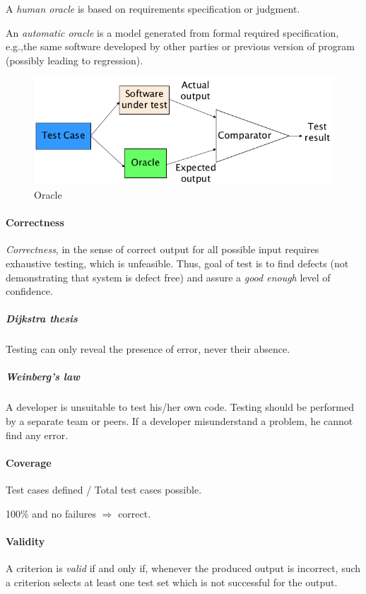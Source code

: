 A \emph{human oracle} is based on requirements specification or judgment.

An \emph{automatic oracle} is a model generated from formal required specification, e.g.,\@ the same software developed by other parties or previous version of program (possibly leading to regression).

\begin{figure}[hbtp]
\centering
\includegraphics[scale=0.35]{images/oracle.png}
\caption{Oracle}
\end{figure}

\paragraph{Correctness}
\emph{Correctness}, in the sense of correct output for all possible input requires exhaustive testing, which is unfeasible. Thus, goal of test is to find defects (not demonstrating that system is defect free) and assure a \emph{good enough} level of confidence.

\subparagraph{Dijkstra thesis} Testing can only reveal the presence of error, never their absence.

\subparagraph{Weinberg's law} A developer is unsuitable to test his/her own code. Testing should be performed by a separate team or peers. If a developer misunderstand a problem, he cannot find any error.

\paragraph{Coverage} Test cases defined / Total test cases possible.

100\% and no failures $\Rightarrow$ correct.

\paragraph{Validity} A criterion is \emph{valid} if and only if, whenever the produced output is incorrect, such a criterion selects at least one test set which is not successful for the output.

